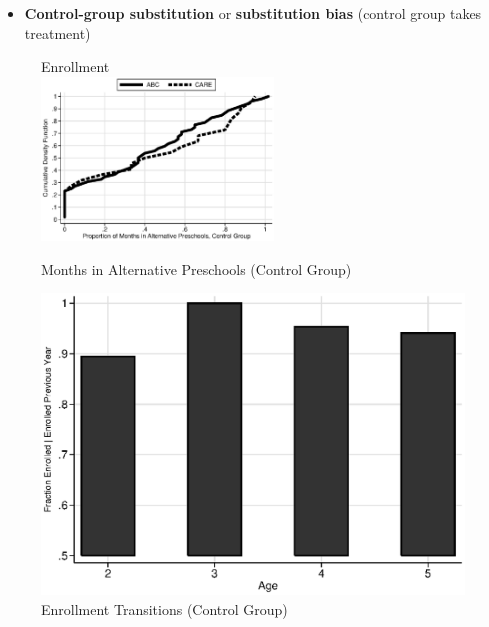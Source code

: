\documentclass[static]{JJH-Beamer}
\begin{document}
\begin{frame}

\begin{itemize}
\item  \textbf{Control-group substitution} or \textbf{substitution bias} (control group takes treatment)
\end{itemize}
\vspace{-2mm}
\begin{figure}[H]
\addtocounter{figure}{-1}
\caption{Months in Alternative Preschools (Control Group)}
\begin{center}
Enrollment \\
\includegraphics[width=0.55\textwidth]{output/abccare_controlcontamination.eps}
\end{center}
\end{figure}

\end{frame}

\begin{frame}

\begin{figure}[H]
\addtocounter{figure}{-1}
\caption{Enrollment Transitions (Control Group)}\label{fig:control-sub} \label{fig:treatsubcare}
\begin{center}
\includegraphics[width=.7\textwidth]{output/abccare_Vprobs.eps}
\end{center}
\end{figure}

\end{frame}
\end{document}
